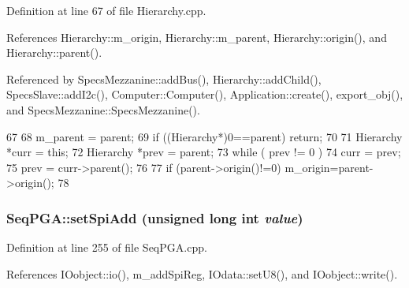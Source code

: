 Definition at line 67 of file Hierarchy.cpp.

References Hierarchy::m\_\-origin, Hierarchy::m\_\-parent, Hierarchy::origin(), and Hierarchy::parent().

Referenced by SpecsMezzanine::addBus(), Hierarchy::addChild(), SpecsSlave::addI2c(), Computer::Computer(), Application::create(), export\_\-obj(), and SpecsMezzanine::SpecsMezzanine().


\begin{DoxyCode}
67                                               {
68   m_parent = parent;
69   if ((Hierarchy*)0==parent) return;
70 
71   Hierarchy *curr = this;
72   Hierarchy *prev = parent;
73   while ( prev != 0 ){
74     curr = prev;
75     prev = curr->parent();
76   }
77   if (parent->origin()!=0) m_origin=parent->origin();
78 }
\end{DoxyCode}
\hypertarget{classSeqPGA_ac998ce3a6d9b5f2e88cc8393f8c1df53}{
\subsubsection[{setSpiAdd}]{ SeqPGA::setSpiAdd (unsigned long int {\em value})}}
\label{classSeqPGA_ac998ce3a6d9b5f2e88cc8393f8c1df53}


Definition at line 255 of file SeqPGA.cpp.

References IOobject::io(), m\_\-addSpiReg, IOdata::setU8(), and IOobject::write().

